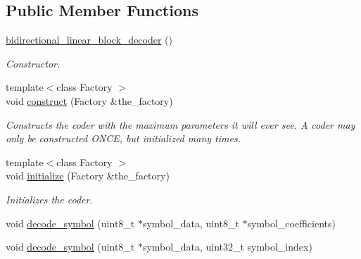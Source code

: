 \subsection*{Public Member Functions}
\begin{DoxyCompactItemize}
\item 
\hypertarget{classkodo_1_1bidirectional__linear__block__decoder_a4fb414cd126fdc992a220f3a3c5f55e6}{\hyperlink{classkodo_1_1bidirectional__linear__block__decoder_a4fb414cd126fdc992a220f3a3c5f55e6}{bidirectional\-\_\-linear\-\_\-block\-\_\-decoder} ()}\label{classkodo_1_1bidirectional__linear__block__decoder_a4fb414cd126fdc992a220f3a3c5f55e6}

\begin{DoxyCompactList}\small\item\em Constructor. \end{DoxyCompactList}\item 
{\footnotesize template$<$class Factory $>$ }\\void \hyperlink{classkodo_1_1bidirectional__linear__block__decoder_a4d60e5a5825583af399c474863db25f9}{construct} (Factory \&the\-\_\-factory)
\begin{DoxyCompactList}\small\item\em Constructs the coder with the maximum parameters it will ever see. A coder may only be constructed O\-N\-C\-E, but initialized many times. \end{DoxyCompactList}\item 
{\footnotesize template$<$class Factory $>$ }\\void \hyperlink{classkodo_1_1bidirectional__linear__block__decoder_a191684ee0401f42d368e072a822f316f}{initialize} (Factory \&the\-\_\-factory)
\begin{DoxyCompactList}\small\item\em Initializes the coder. \end{DoxyCompactList}\item 
void \hyperlink{classkodo_1_1bidirectional__linear__block__decoder_a1b46b766aeb70894a85f550064bc0cc8}{decode\-\_\-symbol} (uint8\-\_\-t $\ast$symbol\-\_\-data, uint8\-\_\-t $\ast$symbol\-\_\-coefficients)
\begin{DoxyCompactList}\small\item\em \end{DoxyCompactList}\item 
void \hyperlink{classkodo_1_1bidirectional__linear__block__decoder_aea8a00a62286c33470e9e18bc609c027}{decode\-\_\-symbol} (uint8\-\_\-t $\ast$symbol\-\_\-data, uint32\-\_\-t symbol\-\_\-index)

\end{DoxyCompactItemize}
